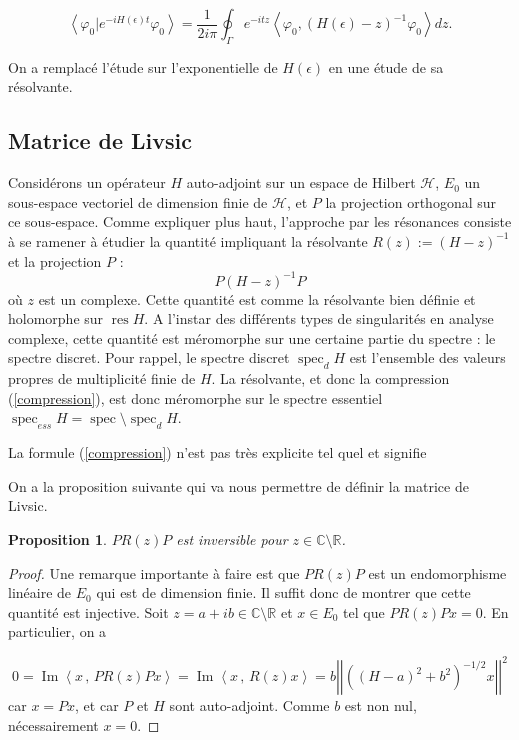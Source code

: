 \documentclass[12pt,openany,a4paper, titlepage]{article}
\newcommand{\f}[2]{\frac{#1}{#2}}
\newcommand{\lp}{\left(}
\newcommand{\rp}{\right)}
\newcommand{\lb}{\left|}
\newcommand{\rb}{\right|}
\newcommand{\la}{\left\langle}
\newcommand{\ra}{\right\rangle}
\newcommand{\R}{\mathbb{R}}
\newcommand{\C}{\mathbb{C}}
\newcommand{\HH}{\mathcal{H}}
\newcommand{\spec}{\operatorname{spec}}
\newcommand{\res}{\operatorname{res}}
\newcommand{\vp}{\varphi}
\newcommand{\He}{H(\epsilon)}
\newcommand{\inv}{^{-1}}
\newcommand{\im}{\operatorname{Im}}
\newtheorem{prop}{Proposition}
\theoremstyle{definition}
\theoremstyle{definition}
\theoremstyle{definition}
\theoremstyle{definition}
\theoremstyle{definition}
\begin{document}
\begin{equation}
    \la \vp_0 | e^{-i\He t} \vp_0\ra = \f{1}{2i\pi}\oint_\Gamma e^{-itz}\la \varphi_0,\lp H(\epsilon)  -z \rp^{-1} \varphi_0 \ra dz.
\end{equation}

On a remplacé l'étude sur l'exponentielle de $\He$ en une étude de sa résolvante.
\newpage
\subsection{Matrice de Livsic}

Considérons un opérateur $H$ auto-adjoint sur un espace de Hilbert $\HH$, $E_0$ un sous-espace vectoriel de dimension finie de $\HH$, et $P$ la projection orthogonal sur ce sous-espace. Comme expliquer plus haut, l'approche par les résonances consiste à se ramener à étudier la quantité impliquant la résolvante $R(z) := (H - z)\inv$ et la projection $P$  :
\begin{equation}\label{compression}
    P(H - z)\inv P
\end{equation}
où $z$ est un complexe. Cette quantité est comme la résolvante bien définie et holomorphe sur $\res H$. A l'instar des différents types de singularités en analyse complexe, cette quantité est méromorphe sur une certaine partie du spectre : le spectre discret. Pour rappel, le spectre discret $\spec_d H$ est l'ensemble des valeurs propres de multiplicité finie de $H$. La résolvante, et donc la compression (\ref{compression}), est donc méromorphe sur le spectre essentiel $\spec_{ess} H = \spec\setminus\spec_d H$. 

La formule (\ref{compression}) n'est pas très explicite tel quel et signifie

On a la proposition suivante qui va nous permettre de définir la matrice de Livsic.

\begin{prop}
    $PR(z)P$ est inversible pour $z\in\C\setminus\R$.
\end{prop}
\begin{proof}
    Une remarque importante à faire est que $PR(z)P$ est un endomorphisme linéaire de $E_0$ qui est de dimension finie. Il suffit donc de montrer que cette quantité est injective. Soit $z = a+ib\in\C\setminus\R$ et $x\in E_0$ tel que $PR(z)Px = 0$. En particulier, on a 

    $$0 = \im\la x\,,\, PR(z)Px \ra = \im\la x\,,\, R(z)x \ra = b\lb\lb\lp (H-a)^2 + b^2 \rp^{-1/2}x\rb\rb^2$$
    car $x = Px$, et car $P$ et $H$ sont auto-adjoint. Comme $b$ est non nul, nécessairement $x = 0$.
\end{proof}
\end{document}
